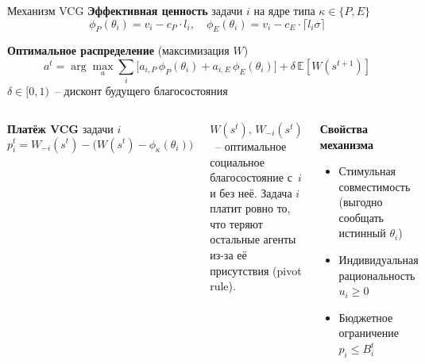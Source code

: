 \documentclass[aspectratio=169]{beamer}
\begin{document}
\begin{frame}{Механизм VCG}
        \textbf{Эффективная ценность} задачи $i$ на ядре типа
        $\kappa \in \{P, E\}$
        $$\phi_P(\theta_i) = v_i - c_P \cdot l_i, \quad
        \phi_E(\theta_i) = v_i - c_E \cdot \lceil l_i \sigma \rceil$$

        \vspace{0.1em}
        \textbf{Оптимальное распределение} (максимизация $W$)
        $$a^t = \arg\max_{a} \sum_i \bigl[a_{i,P}\,\phi_P(\theta_i)
        + a_{i,E}\,\phi_E(\theta_i)\bigr]
        + \delta\, \mathbb{E}[W(s^{t+1})]$$
        {\footnotesize $\delta \in [0,1)$~-- дисконт будущего благосостояния}

        \vspace{0.1em}
        \begin{columns}[T]
                \textbf{Платёж VCG} задачи $i$
                $$p_i^t = W_{-i}(s^t) - \bigl(W(s^t) -
                \phi_\kappa(\theta_i)\bigr)$$

                \vspace{0.1em}
                {\footnotesize $W(s^t),\,W_{-i}(s^t)$~-- оптимальное
                социальное благосостояние с~$i$ и без неё. Задача $i$
                платит ровно то, что теряют остальные агенты из-за её
                присутствия (pivot rule).}

                \begin{shadowbox}
                        \footnotesize
                        \textbf{Свойства механизма}
                        \centering
                        \begin{itemize}
                                \item Стимульная совместимость
                                        (выгодно сообщать истинный $\theta_i$)
                                \item Индивидуальная рациональность
                                        $u_i \geq 0$
                                \item Бюджетное ограничение
                                        $p_i \leq B_i^t$
                        \end{itemize}
                \end{shadowbox}
        \end{columns}
\end{frame}
\end{document}
